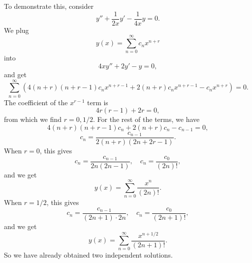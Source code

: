 \documentclass[hyperref, a4paper]{article}
\begin{document}
To demonstrate this, 
consider 
\begin{equation}
    y'' + \frac{1}{2x} y' - \frac{1}{4x} y = 0.
\end{equation}
We plug 
\[
    y(x) = \sum_{n=0}^\infty c_n x^{n + r}
\]
into 
\[
    4 x y'' + 2 y' - y = 0,
\]
and get 
\[
    \sum_{n=0}^\infty \left(
        4 (n + r) (n + r - 1) c_n x^{n + r - 1}
        + 2 (n + r) c_n x^{n + r - 1} 
        - c_n x^{n + r}
    \right) = 0.
\]
The coefficient of the $x^{r-1}$ term is 
\[
    4 r (r - 1) + 2 r = 0,
\]
from which we find $r = 0, 1/2$.
For the rest of the terms, we have 
\[
    4 (n + r) (n + r - 1) c_n
    + 2 (n + r) c_n
    - c_{n-1} = 0,
\]
\[
    c_n = \frac{c_{n-1}}{2 (n + r) (2 n + 2 r - 1)}.
\]
When $r = 0$, this gives 
\[
    c_n = \frac{c_{n-1}}{2n (2n - 1)} , \quad 
    c_n = \frac{c_0}{(2n)!},
\]
and we get 
\begin{equation}
    y(x) = \sum_{n=0}^\infty \frac{x^n}{(2n)!}.
\end{equation}
When $r = 1/2$, this gives 
\[
    c_n = \frac{c_{n-1}}{(2n + 1) \cdot 2n}, \quad 
    c_n = \frac{c_0}{(2 n + 1)!},
\]
and we get 
\begin{equation}
    y(x) = \sum_{n=0}^\infty \frac{x^{n + 1/2}}{(2 n + 1)!}.
\end{equation}
So we have already obtained two independent solutions. 
\end{document}
